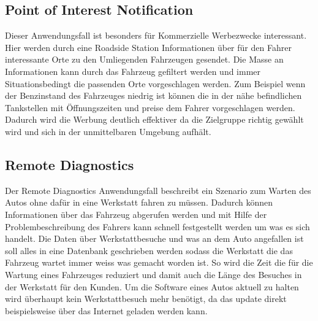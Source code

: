 \subsection{Point of Interest Notification}
Dieser Anwendungsfall ist besonders für Kommerzielle Werbezwecke interessant. Hier werden durch eine Roadside Station Informationen über für den Fahrer interessante Orte zu den Umliegenden Fahrzeugen gesendet. Die Masse an Informationen kann durch das Fahrzeug gefiltert werden und immer Situationsbedingt die passenden Orte vorgeschlagen werden. Zum Beispiel wenn der Benzinstand des Fahrzeuges niedrig ist können die in der nähe befindlichen Tankstellen mit Öffnungszeiten und preise dem Fahrer vorgeschlagen werden. Dadurch wird die Werbung deutlich effektiver da die Zielgruppe richtig gewählt wird und sich in der unmittelbaren Umgebung aufhält.

\subsection{Remote Diagnostics}
Der Remote Diagnostics Anwendungsfall beschreibt ein Szenario zum Warten des Autos ohne dafür in eine Werkstatt fahren zu müssen. Dadurch können Informationen über das Fahrzeug abgerufen werden und mit Hilfe der Problembeschreibung des Fahrers kann schnell festgestellt werden um was es sich handelt. Die Daten über Werkstattbesuche und was an dem Auto angefallen ist soll alles in eine Datenbank geschrieben werden sodass die Werkstatt die das Fahrzeug wartet immer weiss was gemacht worden ist. So wird die Zeit die für die Wartung eines Fahrzeuges reduziert und damit auch die Länge des Besuches in der Werkstatt für den Kunden. Um die Software eines Autos aktuell zu halten wird überhaupt kein Werkstattbesuch mehr benötigt, da das update direkt beispielsweise über das Internet geladen werden kann.